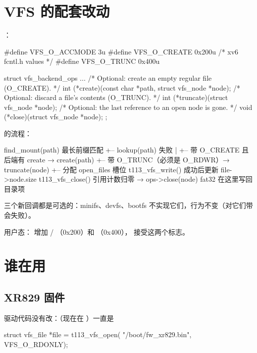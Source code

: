 \section{VFS 的配套改动}

：

\begin{ccode}
#define VFS_O_ACCMODE 3u
#define VFS_O_CREATE 0x200u      /* xv6 fcntl.h values */
#define VFS_O_TRUNC  0x400u

struct vfs_backend_ops {
    ...
    /* Optional: create an empty regular file (O_CREATE). */
    int (*create)(const char *path, struct vfs_node *node);
    /* Optional: discard a file's contents (O_TRUNC). */
    int (*truncate)(struct vfs_node *node);
    /* Optional: the last reference to an open node is gone. */
    void (*close)(struct vfs_node *node);
};
\end{ccode}

 的流程：

\begin{txtcode}
find_mount(path)                    最长前缀匹配
+-- lookup(path) 失败
|   +-- 带 O_CREATE 且后端有 create → create(path)
+-- 带 O_TRUNC（必须是 O_RDWR）→ truncate(node)
+-- 分配 open_files 槽位
t113_vfs_write()   成功后更新 file->node.size
t113_vfs_close()   引用计数归零 → ops->close(node)   fat32 在这里写回目录项
\end{txtcode}

三个新回调都是可选的：minifs、devfs、bootfs 不实现它们，行为不变（对它们带  会失败）。

用户态： 增加  / （0x200）和 （0x400）， 接受这两个标志。

\section{谁在用 }

\subsection{XR829 固件}

驱动代码没有改：（现在在 ）一直是

\begin{ccode}
struct vfs_file *file = t113_vfs_open(
    "/boot/fw_xr829.bin", VFS_O_RDONLY);
\end{ccode}

